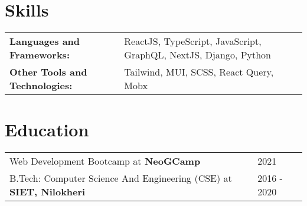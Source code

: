 \documentclass[a4paper,12pt]{article}
\begin{document}
\section{Skills}
\begin{tabularx}{\linewidth}{@{}l X@{}}
\textbf{Languages and Frameworks:} &  \normalsize{ReactJS, TypeScript, JavaScript, GraphQL, NextJS, Django, Python}\\
\textbf{Other Tools and Technologies:}  &  \normalsize{Tailwind, MUI, SCSS, React Query, Mobx}\\ 
\end{tabularx}


\section{Education}
\begin{tabularx}{\linewidth}{@{}l X@{}}	
Web Development Bootcamp at \textbf{NeoGCamp} & \hfill 2021 \\
B.Tech: Computer Science And Engineering (CSE) at \textbf{SIET, Nilokheri} & \hfill 2016 - 2020 \\ 
\end{tabularx}

\vfill
\end{document}
